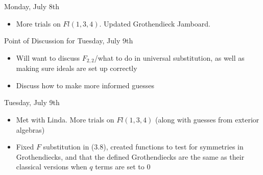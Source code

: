 Monday, July 8th
\begin{itemize}
    \item More trials on $Fl(1, 3, 4)$. Updated Grothendieck Jamboard.
\end{itemize}

Point of Discussion for Tuesday, July 9th
\begin{itemize}
    \item Will want to discuss $F_{2, 2}$/what to do in universal substitution, as well as making sure ideals are set up correctly
    \item Discuss how to make more informed guesses
\end{itemize}

Tuesday, July 9th
\begin{itemize}
    \item Met with Linda. More trials on $Fl(1, 3, 4)$ (along with guesses from exterior algebras)
    \item Fixed $F$ substitution in (3.8), created functions to test for symmetries in Grothendiecks, and that the defined Grothendiecks are the same as their classical versions when $q$ terms are set to $0$
\end{itemize}